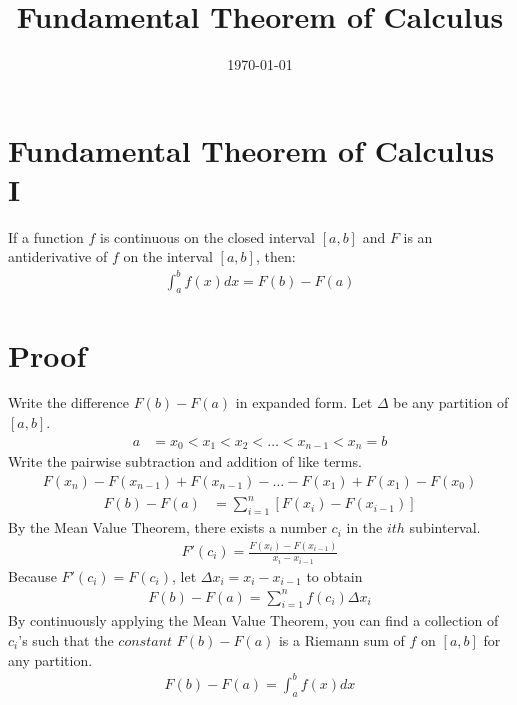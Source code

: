\documentclass[a4paper, 12pt]{article}
\begin{document}
\title{Fundamental Theorem of Calculus}
\date{\today}
\pagestyle{empty} 
\section{Fundamental Theorem of Calculus I}
	If a function $f$ is continuous on the closed interval $[a, b]$ and $F$ is an antiderivative of $f$ on the interval $[a, b]$, then:
\begin{align}
	\int_a^b f(x) dx = F(b) - F(a)
\end{align}
\section{Proof}
	Write the difference $F(b) - F(a)$ in expanded form.  Let $\Delta$ be any partition of $[a, b]$.
\begin{align*}
	a &= x_0 < x_1 < x_2 < \ldots < x_{n-1} < x_n = b
\end{align*}
	Write the pairwise subtraction and addition of like terms.
\begin{align*}
	F(x_n) - F(x_{n-1}) + F(x_{n-1}) - \ldots - F(x_1) + F(x_1) - F(x_0)	
\end{align*}
\begin{align}
	F(b) - F(a) &= \displaystyle\sum_{i=1}^{n} [F(x_i) - F(x_{i-1})]
\end{align}
	By the Mean Value Theorem, there exists a number $c_i$ in the $ith$ subinterval.
\begin{align*}
	F'(c_i) = \frac{F(x_i) - F(x_{i-1})}{x_i - x_{i-1}}
\end{align*}	
	Because $F'(c_i) = F(c_i)$, let $\Delta x_i = x_i - x_{i-1}$ to obtain
\begin{align}
	F(b) - F(a) = \displaystyle\sum_{i=1}^{n} f(c_i) \Delta x_i
\end{align}
	By continuously applying the Mean Value Theorem, you can find a collection of $c_i$'s such that the $constant$ $F(b) - F(a)$ is a Riemann sum of $f$ on $[a, b]$ for any partition.  	
\begin{align*}
	F(b) - F(a) = \int_a^b f(x) dx 
\end{align*}
\end{document}
